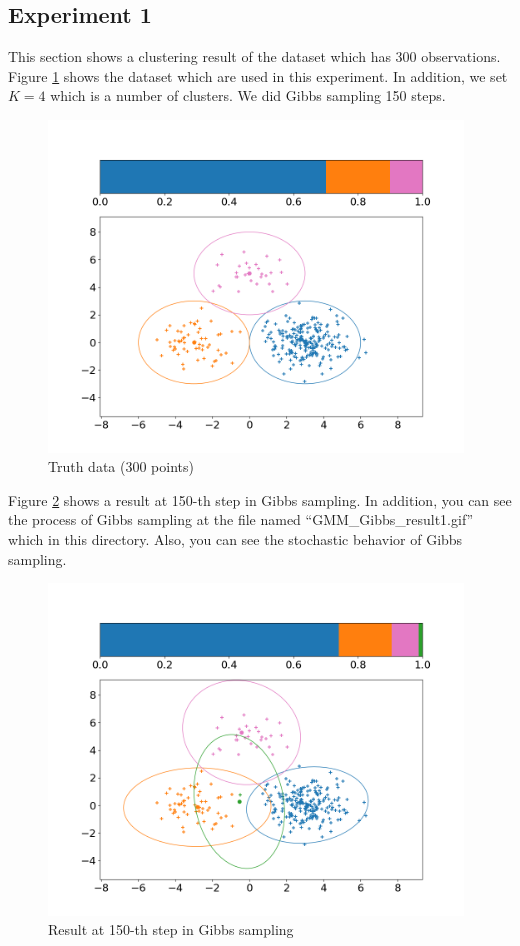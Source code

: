 \documentclass[a4paper]{article}
\begin{document}
\subsection{Experiment 1}
This section shows a clustering result of the dataset which has 300 observations.
Figure \ref{fig:ex1_truth} shows the dataset which are used in this experiment.
In addition, we set $K = 4$ which is a number of clusters.
We did Gibbs sampling 150 steps.
\begin{figure}[h]
	\begin{center}
		\includegraphics[width=11cm]{fig/ex1/truth.png}
		\caption{Truth data (300 points)}
		\label{fig:ex1_truth}
	\end{center}
\end{figure}

Figure \ref{fig:ex1_result} shows a result at 150-th step in Gibbs sampling.
In addition, you can see the process of Gibbs sampling at the file named ``GMM\_Gibbs\_result1.gif'' which in this directory.
Also, you can see the stochastic behavior of Gibbs sampling.
\begin{figure}[h]
	\begin{center}
		\includegraphics[width=11cm]{fig/ex1/final.png}
		\caption{Result at 150-th step in Gibbs sampling}
		\label{fig:ex1_result}
	\end{center}
\end{figure}
\end{document}
